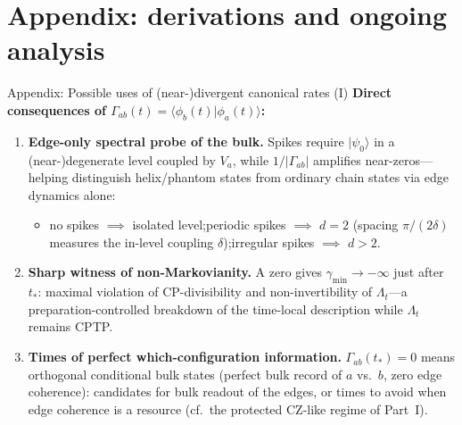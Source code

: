 \documentclass[aspectratio=169,11pt]{beamer}
\newcommand{\ket}[1]{\lvert #1\rangle}
\begin{document}
\section{Appendix: derivations and ongoing analysis}

\begin{frame}{Appendix: Possible uses of (near-)divergent canonical rates (I)}
\small
\textbf{Direct consequences of $\Gamma_{ab}(t)=\langle\phi_b(t)\vert\phi_a(t)\rangle$:}
\smallskip
\begin{enumerate}\setlength\itemsep{6pt}
\item \textbf{Edge-only spectral probe of the bulk.}
Spikes require $\ket{\psi_0}$ in a (near-)degenerate level coupled by $V_a$, while $1/\lvert\Gamma_{ab}\rvert$ amplifies near-zeros---helping distinguish helix/phantom states from ordinary chain states via edge dynamics alone:
\begin{itemize}\footnotesize\setlength\itemsep{2pt}
\item no spikes $\implies$ isolated level;\quad periodic spikes $\implies$ $d=2$ (spacing $\pi/(2\delta)$ measures the in-level coupling $\delta$);\quad irregular spikes $\implies$ $d>2$.
\end{itemize}
\item \textbf{Sharp witness of non-Markovianity.}
A zero gives $\gamma_{\min}\to-\infty$ just after $t_*$: maximal violation of CP-divisibility and non-invertibility of $\Lambda_t$---a preparation-controlled breakdown of the time-local description while $\Lambda_t$ remains CPTP.
\item \textbf{Times of perfect which-configuration information.}
$\Gamma_{ab}(t_*)=0$ means orthogonal conditional bulk states (perfect bulk record of $a$ vs.\ $b$, zero edge coherence): candidates for bulk readout of the edges, or times to avoid when edge coherence is a resource (cf.\ the protected CZ-like regime of Part~I).
\end{enumerate}
\end{frame}
\end{document}
